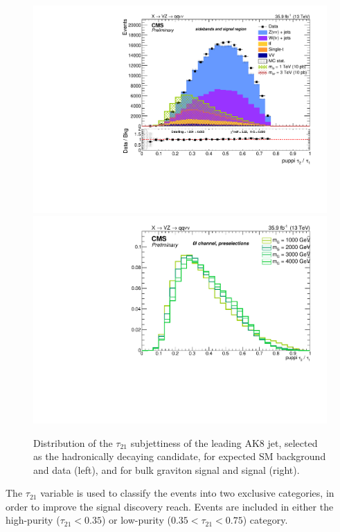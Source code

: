 \begin{figure}[!htb]
  \begin{center}
    \includegraphics[width=.495\textwidth]{figures/FatJet1_puppiTau21.pdf}%
    \includegraphics[width=.495\textwidth]{plots/v9/XVZnnPre/FatJet1_puppiTau21_signalZZ.pdf}
  \end{center}
  \caption{Distribution of the $\tau_{21}$ subjettiness of the leading AK8 jet, selected as the hadronically decaying \V candidate, for expected SM background and data (left), and for bulk graviton signal and \Wp signal (right).}
  \label{fig:fatjet_pre_tau21}
\end{figure}

\vspace*{1\baselineskip}

\noindent The $\tau_{21}$ variable is used to classify the events into two exclusive categories, in order to improve the signal discovery reach. Events are included in either the high-purity ($\tau_{21} < 0.35$) or low-purity ($0.35 < \tau_{21} < 0.75$) category.



